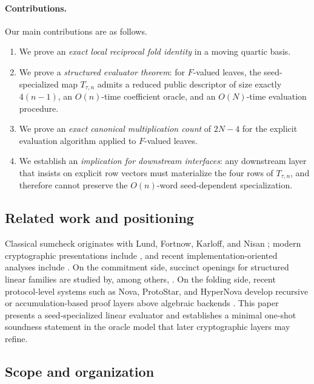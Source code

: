 \documentclass[11pt]{article}
\begin{document}
\paragraph{Contributions.}
Our main contributions are as follows.
\begin{enumerate}[label=\arabic*.]
\item We prove an \emph{exact local reciprocal fold identity} in a moving quartic basis.
\item We prove a \emph{structured evaluator theorem}: for \(F\)-valued leaves, the seed-specialized map \(T_{\tau,n}\) admits a reduced public descriptor of size exactly \(4(n-1)\), an \(O(n)\)-time coefficient oracle, and an \(O(N)\)-time evaluation procedure.
\item We prove an \emph{exact canonical multiplication count} of \(2N-4\) for the explicit evaluation algorithm applied to \(F\)-valued leaves.
\item We establish an \emph{implication for downstream interfaces}: any downstream layer that insists on explicit row vectors must materialize the four rows of \(T_{\tau,n}\), and therefore cannot preserve the \(O(n)\)-word seed-dependent specialization.
\end{enumerate}

\subsection*{Related work and positioning}

Classical sumcheck originates with Lund, Fortnow, Karloff, and Nisan \cite{LFKN92}; modern cryptographic presentations include \cite{BootleChiesaSotiraki2021}, and recent implementation-oriented analyses include \cite{BagadDombThaler2024SmallChar,Rothblum2024MLENote}. On the commitment side, succinct openings for structured linear families are studied by, among others, \cite{CampanelliEtAl2022LMVC,CatalanoFioreTucker2022AHFC,BalbasCatalanoFioreLai2022CFC,FischLiuVesely2024Orbweaver}. On the folding side, recent protocol-level systems such as Nova, ProtoStar, and HyperNova develop recursive or accumulation-based proof layers above algebraic backends \cite{KothapalliSettyTzialla2021Nova,BuenzChen2023ProtoStar,KothapalliSetty2023HyperNova}. This paper presents a seed-specialized linear evaluator and establishes a minimal one-shot soundness statement in the oracle model that later cryptographic layers may refine.

\subsection*{Scope and organization}
\end{document}
